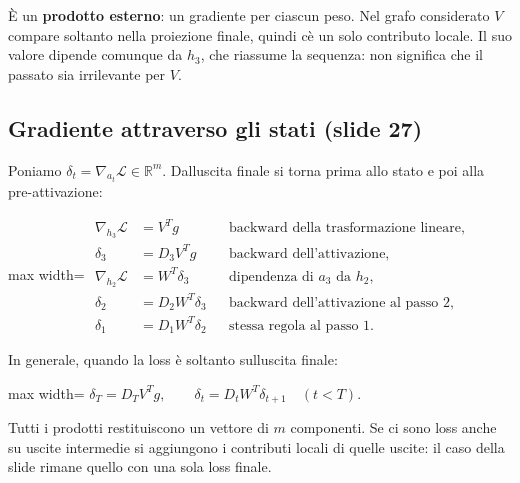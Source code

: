 \documentclass[11pt,a4paper,oneside,openany]{book}
\begin{document}
È un \textbf{prodotto esterno}: un gradiente per ciascun peso. Nel grafo considerato \(V\) compare soltanto nella proiezione finale, quindi c\textquotesingle è un solo contributo locale. Il suo valore dipende comunque da \(h_3\), che riassume la sequenza: non significa che il passato sia irrilevante per \(V\).

\subsection{Gradiente attraverso gli stati (slide 27)}\label{f03-r440}

Poniamo \(\delta_t=\nabla_{a_t}\mathcal L\in\mathbb R^m\). Dall\textquotesingle uscita finale si torna prima allo stato e poi alla pre-attivazione:

\begin{center}
\begin{adjustbox}{max width=\linewidth}
$\displaystyle 
\begin{aligned}
\nabla_{h_3}\mathcal L&=V^Tg
&&\text{backward della trasformazione lineare},\\
\delta_3&=D_3V^Tg
&&\text{backward dell'attivazione},\\
\nabla_{h_2}\mathcal L&=W^T\delta_3
&&\text{dipendenza di }a_3\text{ da }h_2,\\
\delta_2&=D_2W^T\delta_3
&&\text{backward dell'attivazione al passo 2},\\
\delta_1&=D_1W^T\delta_2
&&\text{stessa regola al passo 1}.
\end{aligned}
$
\end{adjustbox}
\end{center}

In generale, quando la loss è soltanto sull\textquotesingle uscita finale:

\begin{center}
\begin{adjustbox}{max width=\linewidth}
$\displaystyle \boxed{\delta_T=D_TV^Tg,\qquad\delta_t=D_tW^T\delta_{t+1}\quad(t<T).}$
\end{adjustbox}
\end{center}

Tutti i prodotti restituiscono un vettore di \(m\) componenti. Se ci sono loss anche su uscite intermedie si aggiungono i contributi locali di quelle uscite: il caso della slide rimane quello con una sola loss finale.
\end{document}
